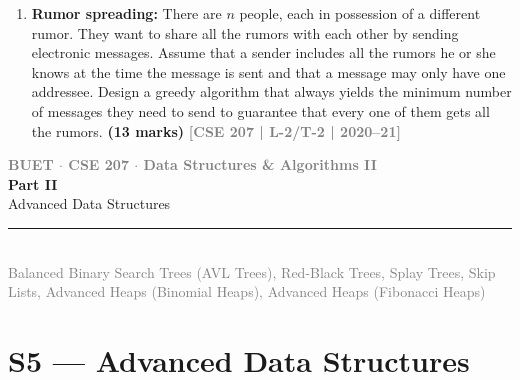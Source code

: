\documentclass[12pt]{article}
\newcommand{\yr}[1]{\hfill\textcolor{gray}{\small\textbf{[#1]}}}
\newcommand{\mk}[1]{\textcolor{orange!70!black}{\small\textbf{(#1 marks)}}}
\newcommand{\secdivider}[5]{%
  \newpage\thispagestyle{empty}%
  \vspace*{\fill}%
  \begin{tcolorbox}[enhanced,colback=#4!7,colframe=#3,boxrule=1.5pt,arc=8pt,
    left=20pt,right=20pt,top=22pt,bottom=22pt,
    shadow={3pt}{-3pt}{0pt}{black!15}]
    \centering
    {\large\textcolor{gray}{\textbf{BUET $\cdot$ CSE 207 $\cdot$ Data Structures \& Algorithms II}}}\\[8pt]
    {\fontsize{26}{32}\selectfont\bfseries\textcolor{#3}{#1}}\\[6pt]
    {\fontsize{15}{19}\selectfont\textcolor{dgray}{#2}}\\[12pt]
    \textcolor{#3!60}{\rule{0.5\textwidth}{0.5pt}}\\[6pt]
    {\small\textcolor{gray}{#5}}
  \end{tcolorbox}%
  \vspace*{\fill}\newpage%
}
\begin{document}
\begin{enumerate}
  \item \textbf{Rumor spreading:} There are $n$ people, each in possession of a different rumor. They want to share all the rumors with each other by sending electronic messages. Assume that a sender includes all the rumors he or she knows at the time the message is sent and that a message may only have one addressee. Design a greedy algorithm that always yields the minimum number of messages they need to send to guarantee that every one of them gets all the rumors.
    \mk{13} \yr{CSE 207 | L-2/T-2 | 2020--21}


\end{enumerate}

\secdivider{Part II}{Advanced Data Structures}{cB}{cB}{Balanced Binary Search Trees (AVL Trees), Red-Black Trees, Splay Trees, Skip Lists, Advanced Heaps (Binomial Heaps), Advanced Heaps (Fibonacci Heaps)}

\section{S5 --- Advanced Data Structures}
\label{sec:S5}

\providecommand{\avltri}[5]{%
  \draw[gray!70!black, thick, fill=#5] (#1,#2) -- ++(-0.55,-1.0) -- ++(1.1,0) -- cycle;
  \node[font=\small] at (#1,{#2-0.68}) {$#3$};
  \node[font=\scriptsize, gray!45!black, below=-1pt] at (#1,{#2-1.0}) {$#4$};}
\providecommand{\bfr}[3]{\node[font=\scriptsize\bfseries, anchor=west, text=#2, inner sep=1pt] at ($(#1)+(0.38,0.22)$) {BF$=#3$};}
\providecommand{\bfl}[3]{\node[font=\scriptsize\bfseries, anchor=east, text=#2, inner sep=1pt] at ($(#1)+(-0.38,0.22)$) {BF$=#3$};}
\providecommand{\avltitle}[3]{\node[font=\small\bfseries, align=center] at (#1,#2) {#3};}
\providecommand{\avlarrow}[3]{\draw[->, very thick, cB] (#1,#2) -- (#3,#2);}
\end{document}
